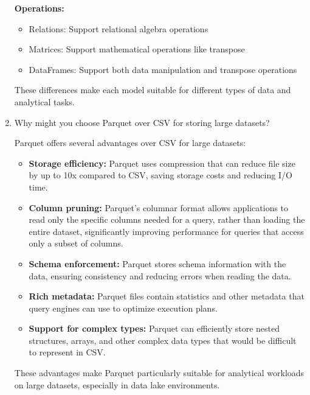 \documentclass[12pt]{article}
\begin{document}
\begin{enumerate}
\begin{tcolorbox}[colback=blue!5!white,colframe=blue!75!black,title={Solution}]
    \textbf{Operations:}
    \begin{itemize}
        \item Relations: Support relational algebra operations
        \item Matrices: Support mathematical operations like transpose
        \item DataFrames: Support both data manipulation and transpose operations
    \end{itemize}
    
    These differences make each model suitable for different types of data and analytical tasks.
    \end{tcolorbox}
    
    \item Why might you choose Parquet over CSV for storing large datasets?
    
    \begin{tcolorbox}[colback=blue!5!white,colframe=blue!75!black,title={Solution}]
    Parquet offers several advantages over CSV for large datasets:
    
    \begin{itemize}
        \item \textbf{Storage efficiency:} Parquet uses compression that can reduce file size by up to 10x compared to CSV, saving storage costs and reducing I/O time.
        
        \item \textbf{Column pruning:} Parquet's columnar format allows applications to read only the specific columns needed for a query, rather than loading the entire dataset, significantly improving performance for queries that access only a subset of columns.
        
        \item \textbf{Schema enforcement:} Parquet stores schema information with the data, ensuring consistency and reducing errors when reading the data.
        
        \item \textbf{Rich metadata:} Parquet files contain statistics and other metadata that query engines can use to optimize execution plans.
        
        \item \textbf{Support for complex types:} Parquet can efficiently store nested structures, arrays, and other complex data types that would be difficult to represent in CSV.
    \end{itemize}
    
    These advantages make Parquet particularly suitable for analytical workloads on large datasets, especially in data lake environments.
    \end{tcolorbox}
    

\end{enumerate}
\end{document}
